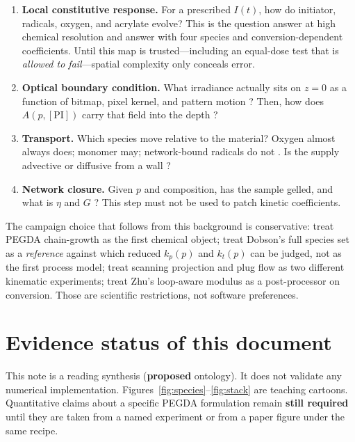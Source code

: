 \documentclass[11pt,a4paper]{article}
\begin{document}
\begin{enumerate}
  \item \textbf{Local constitutive response.}
    For a prescribed $I(t)$, how do initiator, radicals, oxygen, and acrylate evolve?
    This is the question \citet{Dobson2024} answer at high chemical resolution and \citet{Montgomery2022} answer with four species and conversion-dependent coefficients.
    Until this map is trusted---including an equal-dose test that is \emph{allowed to fail}---spatial complexity only conceals error.
  \item \textbf{Optical boundary condition.}
    What irradiance actually sits on $z=0$ as a function of bitmap, pixel kernel, and pattern motion \citep{Meenakshisundaram2020}?
    Then, how does $A(p,[\mathrm{PI}])$ carry that field into the depth \citep{Montgomery2022,Zhu2020}?
  \item \textbf{Transport.}
    Which species move relative to the material?
    Oxygen almost always does; monomer may; network-bound radicals do not \citep{Dobson2024,Montgomery2022}.
    Is the supply advective \citep{Slutzky2019} or diffusive from a wall \citep{Dendukuri2008}?
  \item \textbf{Network closure.}
    Given $p$ and composition, has the sample gelled, and what is $\eta$ and $G$ \citep{Zhu2020}?
    This step must not be used to patch kinetic coefficients.
\end{enumerate}

The campaign choice that follows from this background is conservative: treat PEGDA chain-growth as the first chemical object; treat Dobson's full species set as a \emph{reference} against which reduced $k_p(p)$ and $k_t(p)$ can be judged, not as the first process model; treat scanning projection and plug flow as two different kinematic experiments; treat Zhu's loop-aware modulus as a post-processor on conversion.
Those are scientific restrictions, not software preferences.

\section*{Evidence status of this document}

This note is a reading synthesis (\textbf{proposed} ontology).
It does not validate any numerical implementation.
Figures~\ref{fig:species}--\ref{fig:stack} are teaching cartoons.
Quantitative claims about a specific PEGDA formulation remain \textbf{still required} until they are taken from a named experiment or from a paper figure under the same recipe.



\end{document}
